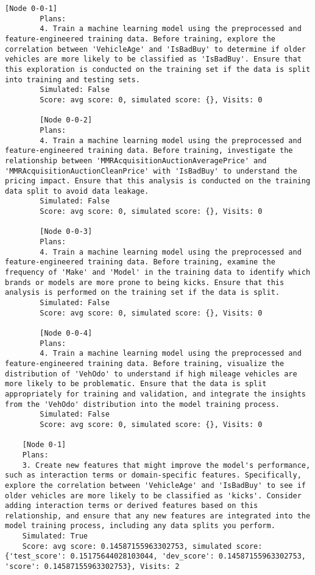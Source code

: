 \begin{lstlisting}[style=txtfile]
		[Node 0-0-1]
		Plans: 
		4. Train a machine learning model using the preprocessed and feature-engineered training data. Before training, explore the correlation between 'VehicleAge' and 'IsBadBuy' to determine if older vehicles are more likely to be classified as 'IsBadBuy'. Ensure that this exploration is conducted on the training set if the data is split into training and testing sets.
		Simulated: False
		Score: avg score: 0, simulated score: {}, Visits: 0

		[Node 0-0-2]
		Plans: 
		4. Train a machine learning model using the preprocessed and feature-engineered training data. Before training, investigate the relationship between 'MMRAcquisitionAuctionAveragePrice' and 'MMRAcquisitionAuctionCleanPrice' with 'IsBadBuy' to understand the pricing impact. Ensure that this analysis is conducted on the training data split to avoid data leakage.
		Simulated: False
		Score: avg score: 0, simulated score: {}, Visits: 0

		[Node 0-0-3]
		Plans: 
		4. Train a machine learning model using the preprocessed and feature-engineered training data. Before training, examine the frequency of 'Make' and 'Model' in the training data to identify which brands or models are more prone to being kicks. Ensure that this analysis is performed on the training set if the data is split.
		Simulated: False
		Score: avg score: 0, simulated score: {}, Visits: 0

		[Node 0-0-4]
		Plans: 
		4. Train a machine learning model using the preprocessed and feature-engineered training data. Before training, visualize the distribution of 'VehOdo' to understand if high mileage vehicles are more likely to be problematic. Ensure that the data is split appropriately for training and validation, and integrate the insights from the 'VehOdo' distribution into the model training process.
		Simulated: False
		Score: avg score: 0, simulated score: {}, Visits: 0

	[Node 0-1]
	Plans: 
	3. Create new features that might improve the model's performance, such as interaction terms or domain-specific features. Specifically, explore the correlation between 'VehicleAge' and 'IsBadBuy' to see if older vehicles are more likely to be classified as 'kicks'. Consider adding interaction terms or derived features based on this relationship, and ensure that any new features are integrated into the model training process, including any data splits you perform.
	Simulated: True
	Score: avg score: 0.14587155963302753, simulated score: {'test_score': 0.15175644028103044, 'dev_score': 0.14587155963302753, 'score': 0.14587155963302753}, Visits: 2


\end{lstlisting}
